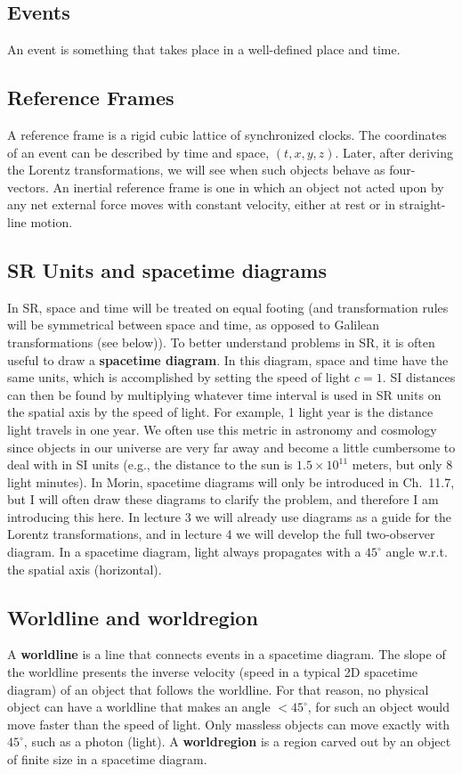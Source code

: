 \documentclass[12pt]{article}
\begin{document}
\subsection{Events}
An event is something that takes place in a well-defined place and time. 

\subsection{Reference Frames}
A reference frame is a rigid cubic lattice of synchronized clocks.
The coordinates of an event can be described by time and space, $(t, x, y, z)$. Later, after deriving the Lorentz transformations, we will see when such objects behave as four-vectors. An inertial reference frame is one in which an object not acted upon by any net external force moves with constant velocity, either at rest or in straight-line motion.

\subsection{SR Units and spacetime diagrams}
In SR, space and time will be treated on equal footing (and transformation rules will be symmetrical between space and time, as opposed to Galilean transformations (see below)). To better understand problems in SR, it is often useful to draw a {\bf spacetime diagram}. In this diagram, space and time have the same units, which is accomplished by setting the speed of light $c = 1$. SI distances can then be found by multiplying whatever time interval is used in SR units on the spatial axis by the speed of light. For example, 1 light year is the distance light travels in one year. We often use this metric in astronomy and cosmology since objects in our universe are very far away and become a little cumbersome to deal with in SI units (e.g., the distance to the sun is $1.5\times 10^{11}$ meters, but only 8 light minutes). In Morin, spacetime diagrams will only be introduced in Ch.~11.7, but I will often draw these diagrams to clarify the problem, and therefore I am introducing this here. In lecture 3 we will already use diagrams as a guide for the Lorentz transformations, and in lecture 4 we will develop the full two-observer diagram. In a spacetime diagram, light always propagates with a $45^{\circ}$ angle w.r.t. the spatial axis (horizontal). 

\subsection{Worldline and worldregion}
A {\bf worldline} is a line that connects events in a spacetime diagram. The slope of the worldline presents the inverse velocity (speed in a typical 2D spacetime diagram) of an object that follows the worldline. For that reason, no physical object can have a worldline that makes an angle $< 45^{\circ}$, for such an object would move faster than the speed of light. Only massless objects can move exactly with $ 45^{\circ}$, such as a photon (light). A {\bf worldregion} is a region carved out by an object of finite size in a spacetime diagram. 
\end{document}
